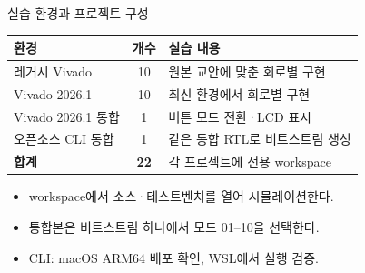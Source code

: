 \begin{frame}[label=lab1-projects]{실습 환경과 프로젝트 구성}
\small
\begin{tabular}{@{}p{3.25cm}cp{5.75cm}@{}}
\textbf{환경} & \textbf{개수} & \textbf{실습 내용}\\\hline
레거시 Vivado & 10 & 원본 교안에 맞춘 회로별 구현\\[0.22cm]
Vivado 2026.1 & 10 & 최신 환경에서 회로별 구현\\[0.22cm]
Vivado 2026.1 통합 & 1 & 버튼 모드 전환·LCD 표시\\[0.22cm]
오픈소스 CLI 통합 & 1 & 같은 통합 RTL로 비트스트림 생성\\\hline
\textbf{합계} & \textbf{22} & 각 프로젝트에 전용 workspace
\end{tabular}
\vspace{0.38cm}
\begin{itemize}
  \item workspace에서 소스·테스트벤치를 열어 시뮬레이션한다.
  \item 통합본은 비트스트림 하나에서 모드 01--10을 선택한다.
  \item CLI: macOS ARM64 배포 확인, WSL에서 실행 검증.
\end{itemize}
\end{frame}


